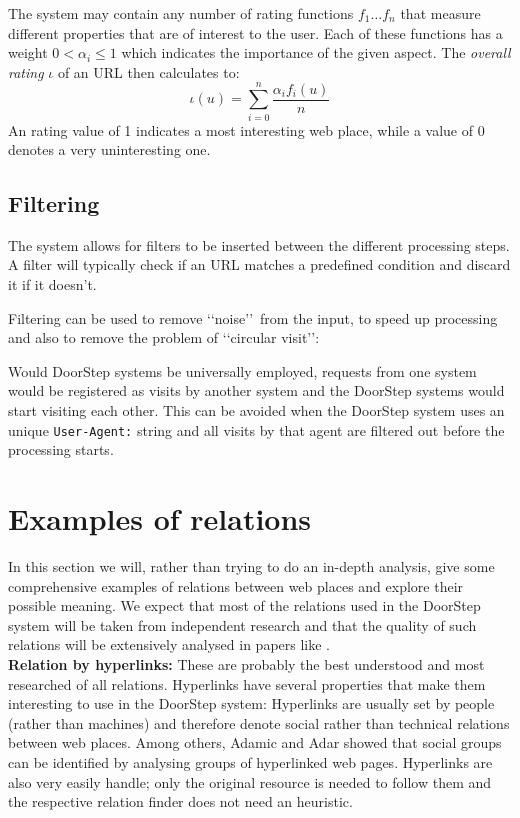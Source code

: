 \documentclass[a4paper]{danarticle}
\theoremstyle{remark}
\begin{document}
       The system may contain any number of rating functions $ f_1
       \dots f_n $ that measure different properties that are of interest to
       the user.
       Each of these functions has a weight
       $ 0 < \alpha_i \leq 1 $ which indicates the importance of the given 
       aspect.
       The \textit{overall rating} $ \iota $ of an URL then calculates
       to:
       \[
         \iota(u) = \sum_{i = 0}^{n} 
	 \frac{\alpha_i f_i(u)}{n}
       \]
       An rating value of 1 indicates a most interesting web place,
       while a
       value of 0 denotes a very uninteresting one. 
     \subsection{Filtering}
       The system allows for filters to be inserted between the different
       processing steps. A filter will typically check if an URL matches a
       predefined condition and discard it if it doesn't.
       
       Filtering can be used to remove \lq\lq noise\rq\rq\ from the input, to 
       speed up processing and also to remove the problem of 
       \lq\lq circular visit\rq\rq : 
       
       Would DoorStep systems be universally 
       employed, requests from one system would be registered as visits by 
       another system and the DoorStep systems would start visiting each other. 
       This can be avoided when the DoorStep system uses an unique 
       \verb$User-Agent:$ string and all visits by that agent are filtered out 
       before the processing starts.
  \section{Examples of relations}
    \label{relexample}
    In this section we will, rather than trying to do an in-depth analysis, give some 
    comprehensive examples of relations between web places and explore their 
    possible meaning. We expect that most of the relations used in the 
    DoorStep system will be taken from independent research and that the quality 
    of such relations will be extensively analysed in papers like \cite{links}.
    \\
    
    \textbf{Relation by hyperlinks:} These are probably the best understood and 
    most researched of all relations. Hyperlinks have several properties that 
    make them interesting to use in the DoorStep system: Hyperlinks are usually 
    set by people (rather than machines) and therefore denote social rather than 
    technical relations between web places. Among others, Adamic and Adar 
    showed that 
    social groups can be identified by analysing groups of hyperlinked web 
    pages\cite{links}. Hyperlinks are also very easily handle; only the original
    resource is needed to follow them and the respective relation finder does
    not need an heuristic.
    \\
    
\end{document}
